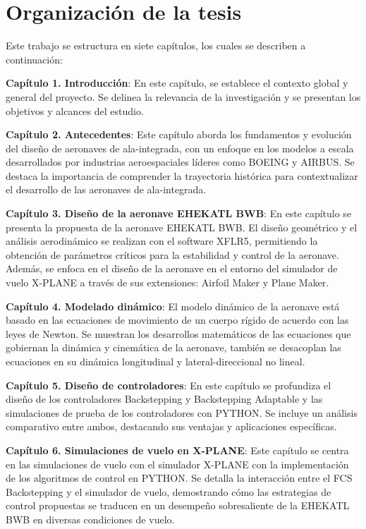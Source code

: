 \section{Organización de la tesis}

Este trabajo se estructura en siete capítulos, los cuales se describen a continuación:

\textbf{Capítulo 1. Introducción}:
En este capítulo, se establece el contexto global y general del proyecto. Se delinea la relevancia de la investigación y se presentan los objetivos y alcances del estudio.

\textbf{Capítulo 2. Antecedentes}:
Este capítulo aborda los fundamentos y evolución del diseño de aeronaves de ala-integrada, con un enfoque en los modelos a escala desarrollados por industrias aeroespaciales líderes como BOEING y AIRBUS. Se destaca la importancia de comprender la trayectoria histórica para contextualizar el desarrollo de las aeronaves de ala-integrada.

\textbf{Capítulo 3. Diseño de la aeronave EHEKATL BWB}:
En este capítulo se presenta la propuesta de la aeronave EHEKATL BWB. El diseño geométrico y el análisis aerodinámico se realizan con el software XFLR5, permitiendo la obtención de parámetros críticos para la estabilidad y control de la aeronave. Además, se enfoca en el diseño de la aeronave en el entorno del simulador de vuelo X-PLANE a través de sus extensiones: Airfoil Maker y Plane Maker.

\textbf{Capítulo 4. Modelado dinámico}:
El modelo dinámico de la aeronave está basado en las ecuaciones de movimiento de un cuerpo rígido de acuerdo con las leyes de Newton. Se muestran los desarrollos matemáticos de las ecuaciones que gobiernan la dinámica y cinemática de la aeronave, también se desacoplan las ecuaciones en su dinámica longitudinal y lateral-direccional no lineal.

\textbf{Capítulo 5. Diseño de controladores}:
En este capítulo se profundiza el diseño de los controladores Backstepping y Backstepping Adaptable y las simulaciones de prueba de los controladores con PYTHON. Se incluye un análisis comparativo entre ambos, destacando sus ventajas y aplicaciones específicas.

\textbf{Capítulo 6. Simulaciones de vuelo en X-PLANE}:
Este capítulo se centra en las simulaciones de vuelo con el simulador X-PLANE con la implementación de los algoritmos de control en PYTHON. Se detalla la interacción entre el FCS Backstepping y el simulador de vuelo, demostrando cómo las estrategias de control propuestas se traducen en un desempeño sobresaliente de la EHEKATL BWB en diversas condiciones de vuelo.

